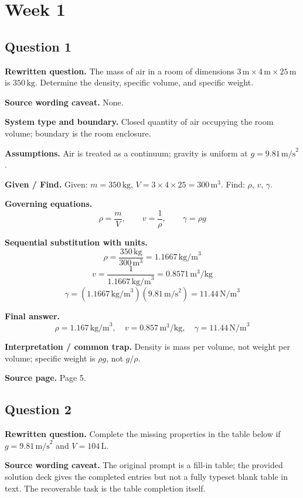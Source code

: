 \section*{Week 1}

\subsection*{Question 1}
\textbf{Rewritten question.} The mass of air in a room of dimensions $3\,\text{m} \times 4\,\text{m} \times 25\,\text{m}$ is $350\,\text{kg}$. Determine the density, specific volume, and specific weight.

\textbf{Source wording caveat.} None.

\textbf{System type and boundary.} Closed quantity of air occupying the room volume; boundary is the room enclosure.

\textbf{Assumptions.} Air is treated as a continuum; gravity is uniform at $g=9.81\,\text{m/s}^2$.

\textbf{Given / Find.}
Given: $m=350\,\text{kg}$, $V=3\times 4\times 25=300\,\text{m}^3$.
Find: $\rho$, $v$, $\gamma$.

\textbf{Governing equations.}
\[
\rho=\frac{m}{V},\qquad v=\frac{1}{\rho},\qquad \gamma=\rho g
\]

\textbf{Sequential substitution with units.}
\[
\rho=\frac{350\,\text{kg}}{300\,\text{m}^3}=1.1667\,\text{kg/m}^3
\]
\[
v=\frac{1}{1.1667\,\text{kg/m}^3}=0.8571\,\text{m}^3/\text{kg}
\]
\[
\gamma=(1.1667\,\text{kg/m}^3)(9.81\,\text{m/s}^2)=11.44\,\text{N/m}^3
\]

\textbf{Final answer.}
\[
\boxed{\rho=1.167\,\text{kg/m}^3,\quad v=0.857\,\text{m}^3/\text{kg},\quad \gamma=11.44\,\text{N/m}^3}
\]

\textbf{Interpretation / common trap.} Density is mass per volume, not weight per volume; specific weight is $\rho g$, not $g/\rho$.

\textbf{Source page.} Page 5.

\subsection*{Question 2}
\textbf{Rewritten question.} Complete the missing properties in the table below if $g=9.81\,\text{m/s}^2$ and $V=104\,\text{L}$.

\textbf{Source wording caveat.} The original prompt is a fill-in table; the provided solution deck gives the completed entries but not a fully typeset blank table in text. The recoverable task is the table completion itself.


